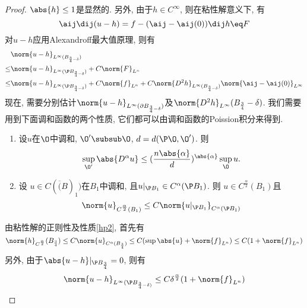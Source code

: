 \begin{proof}
    $\abs{h} \le 1$是显然的.  另外, 由于$h \in C^\infty$, 则在粘性解意义下, 有
    \begin{equation}
        \aij\dij(u-h) = f-(\aij-\aij(0))\dij h \eq F
    \end{equation}
    对$u-h$应用Alexandroff最大值原理, 则有
    \begin{equation}
        \begin{split}
            &\norm{u-h}_{L^\infty(B_{\frac{3}{4}-\delta})}  \\
            \le &\norm{u-h}_{L^\infty(\P B_{\frac{3 }{4}-\delta})} + C\norm{F}_{L^n} \\
            \le &\norm{u-h}_{L^\infty(\P B_{\frac{3 }{4}-\delta})} + C\norm{f}_{L^n}+C\norm{D^2h}_{L^\infty(B_{\frac{3 }{4}-\delta})}\norm{\aij-\aij(0)}_{L^\infty}
        \end{split}
    \end{equation}
    现在, 需要分别估计$\norm{u-h}_{L^\infty(\partial B_{{\frac{3 }{4}-\delta}})}$及$\norm{D^2h}_{L^\infty}(B_\frac{3 }{4}-\delta)$.  我们需要用到下面调和函数的两个性质, 它们都可以由调和函数的Poission积分来得到.  
    \begin{enumerate}
        \item  \label{hp1} 设$u$在$\O$中调和, $\O' \subsub \O$, $d=d(\P\O, \O')$.  则
        \begin{equation}
            \sup_{\O'}\abs{D^\alpha u} \le (\frac{n\abs{\alpha}}{d})^{\abs{\alpha}} \sup_\O u.  
        \end{equation}
        \item \label{hp2} 设 $u \in C(\overline(B)_1)$在$B_1$中调和, 且$u|_{\P B_1} \in C^\alpha(\P B_1)$.  则 $u \in C^{\frac{\alpha}{2}}(B_1)$且
        \begin{equation}
            \norm{u}_{C^\frac{\alpha}{2}(B_1)} \le C\norm{u|_{\P B_1}}_{C^\alpha(\P B_1)}
        \end{equation}
    \end{enumerate}
    由粘性解的{\Holder}正则性及性质\eqref{hp2}, 首先有
    \begin{equation}
        \norm{h}_{C^\frac{\alpha}{2}}(B_\frac{3 }{4}) \le C\norm{u}_{C^\alpha(B_\frac{3 }{4})} \le C(\sup\abs{u}+\norm{f}_{L^n}) \le C(1+\norm{f}_{L^n})
    \end{equation}
    另外, 由于$\abs{u-h}|_{\P B_{\frac{3}{4}}}=0$, 则有
    \begin{equation}
        \norm{u-h}_{L^\infty(\P B_{\frac{3 }{4}-\delta)}} \le C\delta^{\frac{\alpha}{2}}(1+\norm{f}_{L^n})

\end{equation}
\end{proof}

